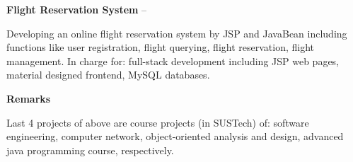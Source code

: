 \documentclass[a4paper,MMMyyyy,nonstopmode]{simpleresumecv}
\begin{document}
\begin{Body}
    \Gap

    \BulletItem
    \textbf{Flight Reservation System}
    \hfill
     --
    \begin{Detail}
        \SubBulletItem Developing an online flight reservation system by JSP and JavaBean including functions like user registration, flight querying, flight reservation, flight management.
        \SubBulletItem In charge for: full-stack development including JSP web pages, material designed frontend, MySQL databases.
    \end{Detail}

    \Gap

    \BulletItem
    \textbf{Remarks}
    \begin{Detail}
        \Item
        Last 4 projects of above are course projects (in SUSTech) of: software engineering, computer network, object-oriented analysis and design, advanced java programming course, respectively.
    \end{Detail}











\end{Body}
\end{document}
